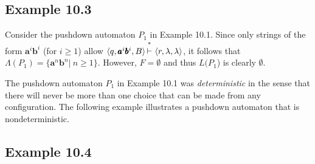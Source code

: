 \subsection*{Example 10.3}

Consider the pushdown automaton $P_1$ in Example 10.1. Since only strings of the
form $\pmb{a}^i\pmb{b}^i$ (for $i \geq 1$) allow $\langle q,\pmb{a}^i\pmb{b}^i,
B\rangle\Dvdash\langle r,\lambda,\lambda\rangle$, it follows that $\Lambda(P_1)
=\{\pmb{a}^n\pmb{b}^n|\ n\geq 1\}$. However, $F=\emptyset$ and thus $L(P_1$) is
clearly $\emptyset$.

The pushdown automaton $P_1$ in Example 10.1 was \emph{deterministic} in the
sense that there will never be more than one choice that can be made from any
configuration. The following example illustrates a pushdown automaton that is
nondeterministic.

\subsection*{Example 10.4}

